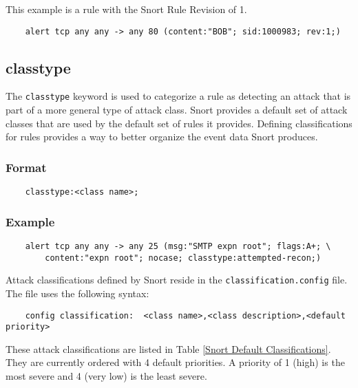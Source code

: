 \documentclass[english]{report}
\begin{document}
This example is a rule with the Snort Rule Revision of 1.

\begin{verbatim}
    alert tcp any any -> any 80 (content:"BOB"; sid:1000983; rev:1;)
\end{verbatim}

\subsection{classtype}

The \texttt{classtype} keyword is used to categorize a rule as detecting an
attack that is part of a more general type of attack class. Snort provides a
default set of attack classes that are used by the default set of rules it
provides. Defining classifications for rules provides a way to better organize
the event data Snort produces.

\subsubsection{Format}

\begin{verbatim}
    classtype:<class name>;
\end{verbatim}

\subsubsection{Example}

\begin{verbatim}
    alert tcp any any -> any 25 (msg:"SMTP expn root"; flags:A+; \
        content:"expn root"; nocase; classtype:attempted-recon;)
\end{verbatim}

Attack classifications defined by Snort reside in the
\texttt{classification.config} file. The file uses the following syntax:

\begin{verbatim}
    config classification:  <class name>,<class description>,<default priority>
\end{verbatim}

These attack classifications are listed in Table \ref{Snort Default
Classifications}. They are currently ordered with 4 default priorities. A
priority of 1 (high) is the most severe and 4 (very low) is the least severe.
\end{document}
